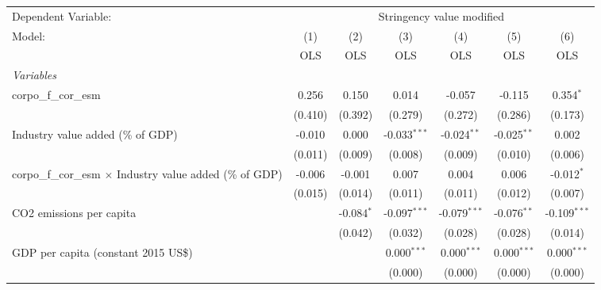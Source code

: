 
\begingroup
\centering
\begin{tabular}{lcccccc}
   \toprule
   Dependent Variable: & \multicolumn{6}{c}{Stringency value modified}\\
   Model:                                                            & (1)     & (2)          & (3)            & (4)            & (5)           & (6)\\  
                                                                     &  OLS    & OLS          & OLS            & OLS            & OLS           & OLS\\  
   \midrule
   \emph{Variables}\\
   corpo\_f\_cor\_esm                                                & 0.256   & 0.150        & 0.014          & -0.057         & -0.115        & 0.354$^{*}$\\   
                                                                     & (0.410) & (0.392)      & (0.279)        & (0.272)        & (0.286)       & (0.173)\\   
   Industry value added (\% of GDP)                                  & -0.010  & 0.000        & -0.033$^{***}$ & -0.024$^{**}$  & -0.025$^{**}$ & 0.002\\   
                                                                     & (0.011) & (0.009)      & (0.008)        & (0.009)        & (0.010)       & (0.006)\\   
   corpo\_f\_cor\_esm $\times$ Industry value added (\% of GDP)      & -0.006  & -0.001       & 0.007          & 0.004          & 0.006         & -0.012$^{*}$\\   
                                                                     & (0.015) & (0.014)      & (0.011)        & (0.011)        & (0.012)       & (0.007)\\   
   CO2 emissions per capita                                          &         & -0.084$^{*}$ & -0.097$^{***}$ & -0.079$^{***}$ & -0.076$^{**}$ & -0.109$^{***}$\\   
                                                                     &         & (0.042)      & (0.032)        & (0.028)        & (0.028)       & (0.014)\\   
   GDP per capita (constant 2015 US\$)                               &         &              & 0.000$^{***}$  & 0.000$^{***}$  & 0.000$^{***}$ & 0.000$^{***}$\\   
                                                                     &         &              & (0.000)        & (0.000)        & (0.000)       & (0.000)\\   

\end{tabular}

